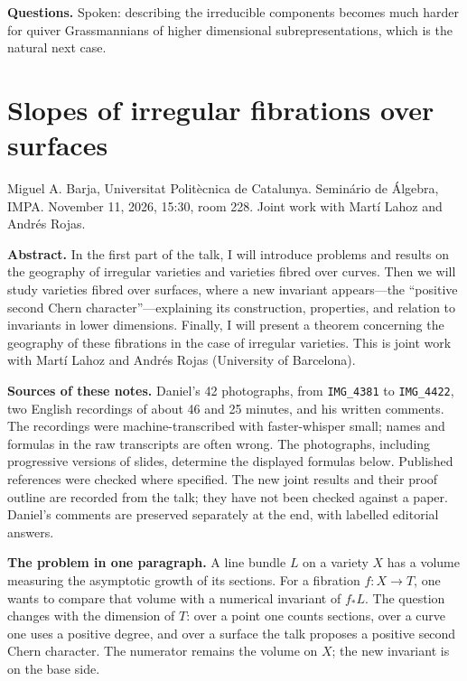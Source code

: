 \medskip\noindent
{\bf Questions.} Spoken: describing the
irreducible components becomes much harder
for quiver Grassmannians of higher
dimensional subrepresentations, which is the
natural next case.


\section{Slopes of irregular fibrations
over surfaces}
\label{section-barja-irregular-fibrations}

\noindent
Miguel A. Barja, Universitat Polit\`ecnica
de Catalunya.
Semin\'ario de \'Algebra, IMPA.
November 11, 2026, 15:30, room 228.
Joint work with Mart\'i Lahoz and
Andr\'es Rojas.

\medskip\noindent
{\bf Abstract.}
In the first part of the talk, I will
introduce problems and results on the
geography of irregular varieties and
varieties fibred over curves. Then we will
study varieties fibred over surfaces, where
a new invariant appears---the ``positive
second Chern character''---explaining its
construction, properties, and relation to
invariants in lower dimensions. Finally, I
will present a theorem concerning the
geography of these fibrations in the case
of irregular varieties. This is joint work
with Mart\'i Lahoz and Andr\'es Rojas
(University of Barcelona).

\medskip\noindent
{\bf Sources of these notes.}
Daniel's 42 photographs, from
\texttt{IMG\_4381} to \texttt{IMG\_4422},
two English recordings of about 46 and
25 minutes, and his written comments.
The recordings were machine-transcribed
with faster-whisper small; names and
formulas in the raw transcripts are often
wrong. The photographs, including
progressive versions of slides, determine
the displayed formulas below. Published
references were checked where specified.
The new joint results and their proof
outline are recorded from the talk;
they have not been checked against a paper.
Daniel's comments are preserved separately
at the end, with labelled editorial answers.

\medskip\noindent
{\bf The problem in one paragraph.}
A line bundle $L$ on a variety $X$ has a
volume measuring the asymptotic growth of
its sections. For a fibration
$f\colon X\to T$, one wants to compare
that volume with a numerical invariant of
$f_*L$. The question changes with the
dimension of $T$: over a point one counts
sections, over a curve one uses a positive
degree, and over a surface the talk
proposes a positive second Chern character.
The numerator remains the volume on $X$;
the new invariant is on the base side.

